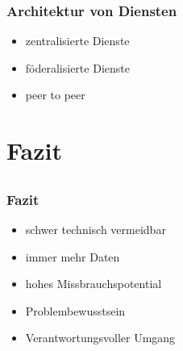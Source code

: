 \documentclass[12pt]{beamer}
\begin{document}
\begin{frame}
  \frametitle{Architektur von Diensten}
  \begin{itemize}
    \item<2-> zentralisierte Dienste
    \item<3-> föderalisierte Dienste
    \item<4-> peer to peer
  \end{itemize}
\end{frame}

\section{Fazit}
\subsection{}

\begin{frame}
  \frametitle{Fazit}
  \begin{itemize}
    \item<2-> schwer technisch vermeidbar
    \item<3-> immer mehr Daten
    \item<4-> hohes Missbrauchspotential
    \item<5-> Problembewusstsein
    \item<6-> Verantwortungsvoller Umgang
  \end{itemize}
\end{frame}
\end{document}
